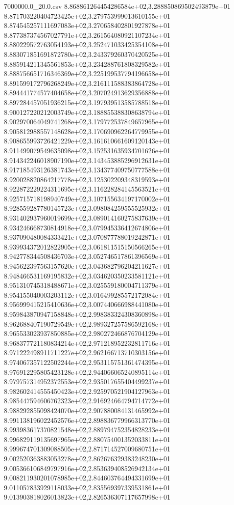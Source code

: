 \begin{filecontents*}{7000000.0_20.0.csv}
8.868861264454286584e+02,3.288850869502493879e+01
8.871703220404723425e+02,3.279753999013610155e+01
8.874545257111697083e+02,3.270658402801927878e+01
8.877387374567027791e+02,3.261564080921107234e+01
8.880229572763054193e+02,3.252471033425354108e+01
8.883071851691872780e+02,3.243379260370420525e+01
8.885914211345561853e+02,3.234288761808329582e+01
8.888756651716346369e+02,3.225199537794196658e+01
8.891599172796268249e+02,3.216111588383864728e+01
8.894441774577404658e+02,3.207024913629356888e+01
8.897284457051936215e+02,3.197939513585788518e+01
8.900127220212003749e+02,3.188855388308638794e+01
8.902970064049741268e+02,3.179772537849657965e+01
8.905812988557148628e+02,3.170690962264779955e+01
8.908655993726421229e+02,3.161610661609120143e+01
8.911499079549635098e+02,3.152531635934701626e+01
8.914342246018907190e+02,3.143453885296912631e+01
8.917185493126381743e+02,3.134377409750777588e+01
8.920028820864217778e+02,3.125302209348319593e+01
8.922872229224311695e+02,3.116228284145563521e+01
8.925715718198940749e+02,3.107155634197170002e+01
8.928559287780145723e+02,3.098084259555525932e+01
8.931402937960019699e+02,3.089014160275837639e+01
8.934246668730814918e+02,3.079945336412674806e+01
8.937090480084333421e+02,3.070877788019242871e+01
8.939934372012822905e+02,3.061811515150566265e+01
8.942778344508436703e+02,3.052746517861396569e+01
8.945622397563157620e+02,3.043682796204211627e+01
8.948466531169195832e+02,3.034620350233581121e+01
8.951310745318488671e+02,3.025559180004711379e+01
8.954155040003203112e+02,3.016499285572172084e+01
8.956999415215410636e+02,3.007440666988441080e+01
8.959843870947158848e+02,2.998383324308360898e+01
8.962688407190729549e+02,2.989327257586592168e+01
8.965533023937850885e+02,2.980272466876704129e+01
8.968377721180834214e+02,2.971218952232811716e+01
8.971222498911711227e+02,2.962166713710303156e+01
8.974067357122502244e+02,2.953115751361474395e+01
8.976912295805423128e+02,2.944066065240895114e+01
8.979757314952372553e+02,2.935017655404499237e+01
8.982602414555450423e+02,2.925970521904127963e+01
8.985447594606762323e+02,2.916924664794714772e+01
8.988292855098424070e+02,2.907880084131465992e+01
8.991138196022452576e+02,2.898836779966313770e+01
8.993983617370821548e+02,2.889794752354828233e+01
8.996829119135697965e+02,2.880754001352033811e+01
8.999674701309088505e+02,2.871714527009680751e+01
9.002520363883053278e+02,2.862676329383248230e+01
9.005366106849797916e+02,2.853639408526942134e+01
9.008211930201078985e+02,2.844603764494331699e+01
9.011057833929118033e+02,2.835569397339531861e+01
9.013903818026013823e+02,2.826536307117657998e+01

\end{filecontents*}
